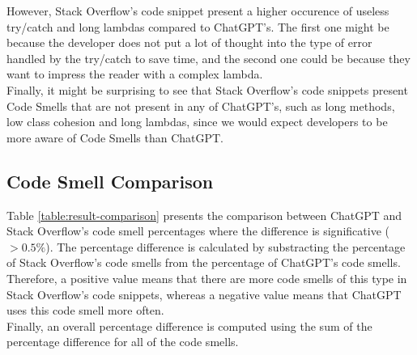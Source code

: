 However, Stack Overflow's code snippet present a higher occurence of useless try/catch and long lambdas compared to ChatGPT's. The first one might be because the developer does not put a lot of thought into the type of error handled by the try/catch to save time, and the second one could be because they want to impress the reader with a complex lambda. \\

Finally, it might be surprising to see that Stack Overflow's code snippets present Code Smells that are not present in any of ChatGPT's, such as long methods, low class cohesion and long lambdas, since we would expect developers to be more aware of Code Smells than ChatGPT.

\subsection{Code Smell Comparison}
\label{sec:results-comparison}

Table \ref{table:result-comparison} presents the comparison between ChatGPT and Stack Overflow's code smell percentages where the difference is significative ($>0.5\%$). The percentage difference is calculated by substracting the percentage of Stack Overflow's code smells from the percentage of ChatGPT's code smells. \\

Therefore, a positive value means that there are more code smells of this type in Stack Overflow's code snippets, whereas a negative value means that ChatGPT uses this code smell more often. \\

Finally, an overall percentage difference is computed using the sum of the percentage difference for all of the code smells. \\

